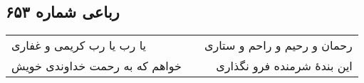 \begin{center}
\section*{رباعی شماره ۶۵۳}
\label{sec:sh653}
\begin{longtable}{l p{0.5cm} r}
یا رب یا رب کریمی و غفاری
&&
رحمان و رحیم و راحم و ستاری
\\
خواهم که به رحمت خداوندی خویش
&&
این بندهٔ شرمنده فرو نگذاری
\\
\end{longtable}
\end{center}
